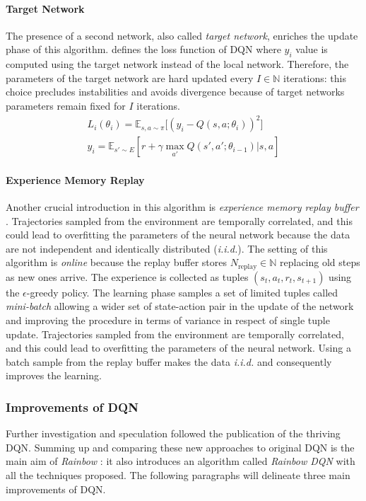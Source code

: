 \paragraph{Target Network}
The presence of a second network, also called  \textit{target network}, enriches the update phase of this algorithm. 
defines the loss function of DQN where $y_i$ value is computed using the target network instead of the local network. Therefore, the parameters of the target network are hard updated every $I \in \mathbb{N}$ iterations: this choice precludes instabilities and avoids divergence because of target networks parameters remain fixed for $I$ iterations.
\begin{equation} \label{eq:lossdqn}
\begin{gathered}
L_i(\theta_i) = \mathbb{E}_{s, a \sim \pi}\big[(y_i - Q(s, a; \theta_i))^2\big]\\
y_i = \mathbb{E}_{s' \sim E}[r + \gamma \max_{a'}Q(s',a'; \theta_{i-1})|s,a]
\end{gathered}
\end{equation}

\paragraph{Experience Memory Replay} \label{experience}

Another crucial introduction in this algorithm is \textit{experience memory replay buffer} \cite{lin1992self}. Trajectories sampled from the environment are temporally correlated, and this could lead to overfitting the parameters of the neural network because the data are not independent and identically distributed (\textit{i.i.d.}). The setting of this algorithm is \textit{online} because the replay buffer stores $N_{\text{replay}} \in \mathbb{N}$ replacing old steps as new ones arrive. The experience is collected as tuples $(s_t,a_t,r_t,s_{t+1})$ using the $\epsilon$-greedy policy. The learning phase samples a set of limited tuples called \textit{mini-batch} allowing a wider set of state-action pair in the update of the network and improving the procedure in terms of variance in respect of single tuple update.
Trajectories sampled from the environment are temporally correlated, and this could lead to overfitting the parameters of the neural network. Using a batch sample from the replay buffer makes the data \textit{i.i.d.} and consequently improves the learning.

\subsubsection{Improvements of DQN}
Further investigation and speculation followed the publication of the thriving DQN. Summing up and comparing these new approaches to original DQN is the main aim of \textit{Rainbow} \cite{hessel2018rainbow}: it also introduces an algorithm called \textit{Rainbow DQN} with all the techniques proposed. The following paragraphs will delineate three main improvements of DQN.

